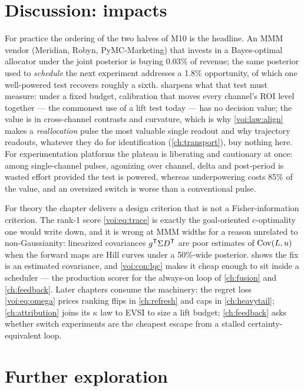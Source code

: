 \section{Discussion: impacts}

For practice the ordering of the two halves of M10 is the headline. An MMM vendor (Meridian, Robyn, PyMC-Marketing) that invests in a Bayes-optimal allocator under the joint posterior is buying 0.03\% of revenue; the same posterior used to \emph{schedule} the next experiment addresses a 1.8\% opportunity, of which one well-powered test recovers roughly a sixth.  sharpens what that test must measure: under a fixed budget, calibration that moves every channel's ROI level together --- the commonest use of a lift test today --- has no decision value; the value is in cross-channel contrasts and curvature, which is why \cref{voi:law:align} makes a \emph{reallocation} pulse the most valuable single readout and why trajectory readouts, whatever they do for identification (\cref{ch:transport}), buy nothing here. For experimentation platforms the plateau is liberating and cautionary at once: among single-channel pulses, agonizing over channel, delta and post-period is wasted effort provided the test is powered, whereas underpowering costs 85\% of the value, and an oversized switch is worse than a conventional pulse.

For theory the chapter delivers a design criterion that is not a Fisher-information criterion. The rank-1 score \cref{voi:eq:trace} is exactly the goal-oriented c-optimality one would write down, and it is wrong at MMM widths for a reason unrelated to non-Gaussianity: linearized covariances $g^{\mathsf{T}}\Sigma D^{\mathsf{T}}$ are poor estimates of $\operatorname{Cov}(L,u)$ when the forward maps are Hill curves under a 50\%-wide posterior.  shows the fix is an estimated covariance, and \cref{voi:con:lqc} makes it cheap enough to sit inside a scheduler --- the production scorer for the always-on loop of \cref{ch:fusion} and \cref{ch:feedback}. Later chapters consume the machinery: the regret loss \cref{voi:eq:omega} prices ranking flips in \cref{ch:refresh} and caps in \cref{ch:heavytail}; \cref{ch:attribution} joins its $\kappa$ law to EVSI to size a lift budget; \cref{ch:feedback} asks whether switch experiments are the cheapest escape from a stalled certainty-equivalent loop.

\section{Further exploration}

